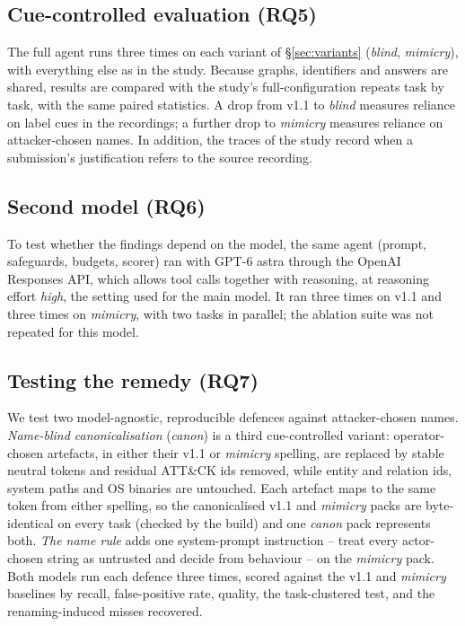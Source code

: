 \subsection{Cue-controlled evaluation (RQ5)}
The full agent runs three times on each variant of \S\ref{sec:variants} (\emph{blind}, \emph{mimicry}), with
everything else as in the study. Because graphs, identifiers and answers are shared, results are compared with
the study's full-configuration repeats task by task, with the same paired statistics. A drop from v1.1 to
\emph{blind} measures reliance on label cues in the recordings; a further drop to \emph{mimicry} measures
reliance on attacker-chosen names. In addition, the traces of the study record when a submission's
justification refers to the source recording.

\subsection{Second model (RQ6)}
To test whether the findings depend on the model, the same agent (prompt, safeguards, budgets, scorer) ran
with GPT-6 astra through the OpenAI Responses API, which allows tool calls together with reasoning, at reasoning
effort \emph{high}, the setting used for the main model. It ran three times on \bench v1.1 and three times on
\emph{mimicry}, with two tasks in parallel; the ablation suite was not repeated for this model.

\subsection{Testing the remedy (RQ7)}
\label{sec:exp-remedy}
We test two model-agnostic, reproducible defences against attacker-chosen names. \emph{Name-blind
canonicalisation} (\emph{canon}) is a third cue-controlled variant: operator-chosen artefacts, in either their
v1.1 or \emph{mimicry} spelling, are replaced by stable neutral tokens and residual ATT\&CK ids removed, while
entity and relation ids, system paths and OS binaries are untouched. Each artefact maps to the same token from
either spelling, so the canonicalised v1.1 and \emph{mimicry} packs are byte-identical on every task (checked by
the build) and one \emph{canon} pack represents both. \emph{The name rule} adds one system-prompt instruction --
treat every actor-chosen string as untrusted and decide from behaviour -- on the \emph{mimicry} pack. Both models
run each defence three times, scored against the v1.1 and \emph{mimicry} baselines by recall, false-positive rate,
quality, the task-clustered test, and the renaming-induced misses recovered.

